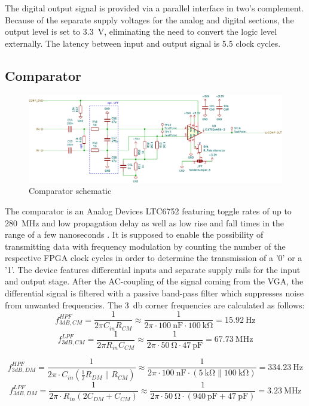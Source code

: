 \documentclass[
	english,
	ruledheaders=section, %
	class=report,%
	thesis={type=Project Seminar Report},%
	accentcolor=TUDa-1d, %
	custommargins=false,%
	marginpar=false,%
	parskip=half-,%
	fontsize=11pt,%
]{tudapub}
\begin{document}
The digital output signal is provided via a parallel interface in two's complement. Because of the separate supply voltages for the analog and digital sections, the output level is set to \SI{3.3}{\volt}, eliminating the need to convert the logic level externally. The latency between input and output signal is 5.5 clock cycles.

\subsection{Comparator}

\begin{figure}[H]
    \centering
    \includegraphics[width=1.0\columnwidth]{schematics/sch_comparator.pdf}
    \caption{Comparator schematic}
    \label{sch:comparator}
\end{figure}
The comparator is an Analog Devices LTC6752 featuring toggle rates of up to \SI{280}{\mega\hertz} and low propagation delay as well as low rise and fall times in the range of a few nanoseconds \autocite{analogdevices280MHz9nsComparator2014}. It is supposed to enable the possibility of transmitting data with frequency modulation by counting the number of the respective \gls{FPGA} clock cycles in order to determine the transmission of a '0' or a '1'. The device features differential inputs and separate supply rails for the input and output stage. After the AC-coupling of the signal coming from the \gls{VGA}, the differential signal is filtered with a passive band-pass filter which suppresses noise from unwanted frequencies. The \SI{3}{\decibel} corner frequencies are calculated as follows:
\[f_{3dB,CM}^{HPF} = \frac{1}{2\pi C_{in} R_{CM}}\approx \frac{1}{2\pi \cdot \SI{100}{\nano\farad} \cdot \SI{100}{\kilo\ohm}} = \SI{15.92}{\hertz}\]
\[f_{3dB,CM}^{LPF} = \frac{1}{2\pi R_{in} C_{CM}}\approx \frac{1}{2\pi \cdot \SI{50}{\ohm} \cdot \SI{47}{\pico\farad}} = \SI{67.73}{\mega\hertz}\]

\[f_{3dB,DM}^{HPF} = \frac{1}{2\pi \cdot C_{in} \left( \frac{1}{2}R_{DM} \| R_{CM} \right)}\approx \frac{1}{2\pi \cdot \SI{100}{\nano\farad} \cdot \left( \SI{5}{\kilo\ohm} \| \SI{100}{\kilo\ohm} \right)} = \SI{334.23}{\hertz}\]
\[f_{3dB,DM}^{LPF} = \frac{1}{2\pi \cdot R_{in} \left( 2C_{DM}+C_{CM} \right)}\approx \frac{1}{2\pi \cdot \SI{50}{\ohm} \cdot \left( \SI{940}{\pico\farad} + \SI{47}{\pico\farad} \right)} = \SI{3.23}{\mega\hertz}\]
\end{document}
